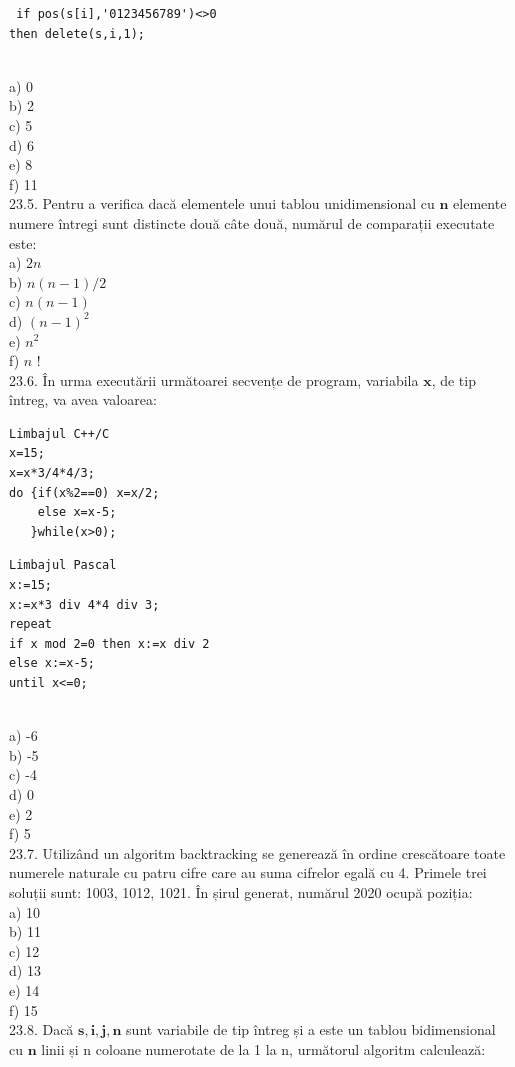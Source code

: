 {{\begin{verbatim}
 if pos(s[i],'0123456789')<>0 
then delete(s,i,1); 
\end{verbatim}
\\
a) 0
\\
b) 2
\\
c) 5
\\
d) 6
\\
e) 8
\\
f) 11
\\
23.5. Pentru a verifica dacă elementele unui tablou unidimensional cu $\mathbf{n}$ elemente numere întregi sunt distincte două câte două, numărul de comparații executate este:
\\
a) $2 n$
\\
b) $n(n-1) / 2$
\\
c) $n(n-1)$
\\
d) $(n-1)^{2}$
\\
e) $n^{2}$
\\
f) $n$ !
\\
23.6. În urma executării următoarei secvențe de program, variabila $\mathbf{x}$, de tip întreg, va avea valoarea:
\begin{verbatim}
Limbajul C++/C 
x=15; 
x=x*3/4*4/3; 
do {if(x%2==0) x=x/2; 
    else x=x-5; 
   }while(x>0);
\end{verbatim}
\begin{verbatim}
Limbajul Pascal 
x:=15; 
x:=x*3 div 4*4 div 3; 
repeat  
if x mod 2=0 then x:=x div 2 
else x:=x-5; 
until x<=0; 
\end{verbatim}
\\
a) -6
\\
b) -5
\\
c) -4
\\
d) 0
\\
e) 2
\\
f) 5
\\
23.7. Utilizând un algoritm backtracking se generează în ordine crescătoare toate numerele naturale cu patru cifre care au suma cifrelor egală cu 4. Primele trei soluții sunt: 1003, 1012, 1021. În șirul generat, numărul 2020 ocupă poziția:
\\
a) 10
\\
b) 11
\\
c) 12
\\
d) 13
\\
e) 14
\\
f) 15
\\
23.8. Dacă $\mathbf{s}, \mathbf{i}, \mathbf{j}, \mathbf{n}$ sunt variabile de tip întreg și a este un tablou bidimensional cu $\mathbf{n}$ linii și n coloane numerotate de la 1 la n, următorul algoritm calculează:
}}

